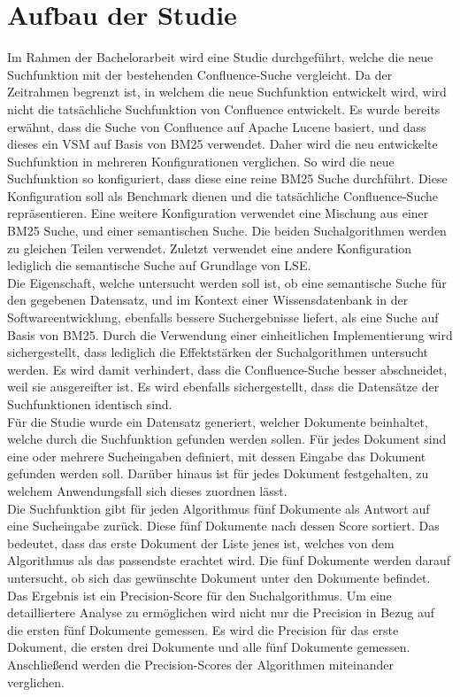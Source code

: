 \section{Aufbau der Studie}
Im Rahmen der Bachelorarbeit wird eine Studie durchgeführt, welche die neue Suchfunktion mit der bestehenden Confluence-Suche vergleicht.
Da der Zeitrahmen begrenzt ist, in welchem die neue Suchfunktion entwickelt wird, wird nicht die tatsächliche Suchfunktion von Confluence entwickelt.
Es wurde bereits erwähnt, dass die Suche von Confluence auf Apache Lucene basiert, und dass dieses ein VSM auf Basis von BM25 verwendet.
Daher wird die neu entwickelte Suchfunktion in mehreren Konfigurationen verglichen.
So wird die neue Suchfunktion so konfiguriert, dass diese eine reine BM25 Suche durchführt.
Diese Konfiguration soll als Benchmark dienen und die tatsächliche Confluence-Suche repräsentieren.
Eine weitere Konfiguration verwendet eine Mischung aus einer BM25 Suche, und einer semantischen Suche.
Die beiden Suchalgorithmen werden zu gleichen Teilen verwendet.
Zuletzt verwendet eine andere Konfiguration lediglich die semantische Suche auf Grundlage von LSE.\\

Die Eigenschaft, welche untersucht werden soll ist, ob eine semantische Suche für den gegebenen Datensatz, und im Kontext einer Wissensdatenbank in der Softwareentwicklung, ebenfalls bessere Suchergebnisse liefert, als eine Suche auf Basis von BM25.
Durch die Verwendung einer einheitlichen Implementierung wird sichergestellt, dass lediglich die Effektstärken der Suchalgorithmen untersucht werden.
Es wird damit verhindert, dass die Confluence-Suche besser abschneidet, weil sie ausgereifter ist.
Es wird ebenfalls sichergestellt, dass die Datensätze der Suchfunktionen identisch sind.\\

Für die Studie wurde ein Datensatz generiert, welcher Dokumente beinhaltet, welche durch die Suchfunktion gefunden werden sollen.
Für jedes Dokument sind eine oder mehrere Sucheingaben definiert, mit dessen Eingabe das Dokument gefunden werden soll.
Darüber hinaus ist für jedes Dokument festgehalten, zu welchem Anwendungsfall sich dieses zuordnen lässt.\\

Die Suchfunktion gibt für jeden Algorithmus fünf Dokumente als Antwort auf eine Sucheingabe zurück.
Diese fünf Dokumente nach dessen Score sortiert.
Das bedeutet, dass das erste Dokument der Liste jenes ist, welches von dem Algorithmus als das passendste erachtet wird.
Die fünf Dokumente werden darauf untersucht, ob sich das gewünschte Dokument unter den Dokumente befindet.
Das Ergebnis ist ein Precision-Score für den Suchalgorithmus.
Um eine detailliertere Analyse zu ermöglichen wird nicht nur die Precision in Bezug auf die ersten fünf Dokumente gemessen.
Es wird die Precision für das erste Dokument, die ersten drei Dokumente und alle fünf Dokumente gemessen.
Anschließend werden die Precision-Scores der Algorithmen miteinander verglichen.\\

